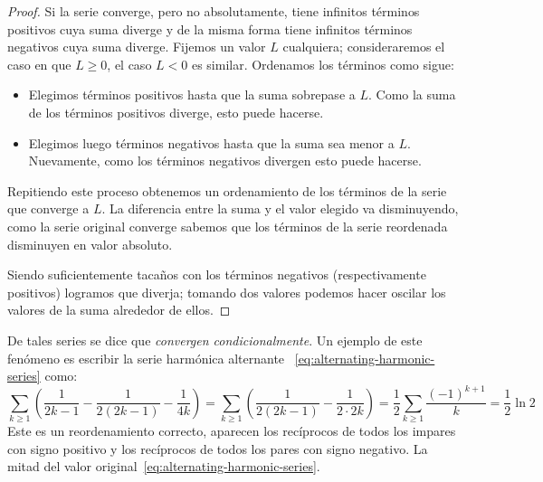   \begin{proof}
    Si la serie converge,
    pero no absolutamente,
    tiene infinitos términos positivos cuya suma diverge
    y de la misma forma tiene infinitos términos negativos
    cuya suma diverge.
    Fijemos un valor \(L\) cualquiera;
    consideraremos el caso en que \(L \ge 0\),
    el caso \(L < 0\) es similar.
    Ordenamos los términos como sigue:
    \begin{itemize}
    \item
      Elegimos términos positivos
      hasta que la suma sobrepase a \(L\).
      Como la suma de los términos positivos diverge,
      esto puede hacerse.
    \item
      Elegimos luego términos negativos
      hasta que la suma sea menor a \(L\).
      Nuevamente,
      como los términos negativos divergen esto puede hacerse.
    \end{itemize}
    Repitiendo este proceso obtenemos un ordenamiento
    de los términos de la serie que converge a \(L\).
    La diferencia entre la suma y el valor elegido va disminuyendo,
    como la serie original converge
    sabemos que los términos de la serie reordenada
    disminuyen en valor absoluto.

    Siendo suficientemente tacaños con los términos negativos
    (respectivamente positivos)
    logramos que diverja;
    tomando dos valores podemos hacer oscilar los valores de la suma
    alrededor de ellos.
  \end{proof}
  De tales series se dice que \emph{convergen condicionalmente}.%
  Un ejemplo de este fenómeno
  es escribir la serie harmónica alternante~%
    \eqref{eq:alternating-harmonic-series}
  como:
  \begin{equation}
    \label{eq:alternating-harmonic-series-reordered-value}
    \sum_{k \ge 1}
      \left(
	\frac{1}{2 k - 1} - \frac{1}{2 (2 k - 1)} - \frac{1}{4 k}
      \right)
      = \sum_{k \ge 1}
	  \left(
	    \frac{1}{2 (2 k - 1)} - \frac{1}{2 \cdot 2 k}
	  \right)
      = \frac{1}{2}
	  \sum_{k \ge 1} \frac{(-1)^{k + 1}}{k}
      = \frac{1}{2} \ln 2
  \end{equation}
  Este es un reordenamiento correcto,
  aparecen los recíprocos de todos los impares con signo positivo
  y los recíprocos de todos los pares con signo negativo.
  La mitad
  del valor original~\eqref{eq:alternating-harmonic-series}.

